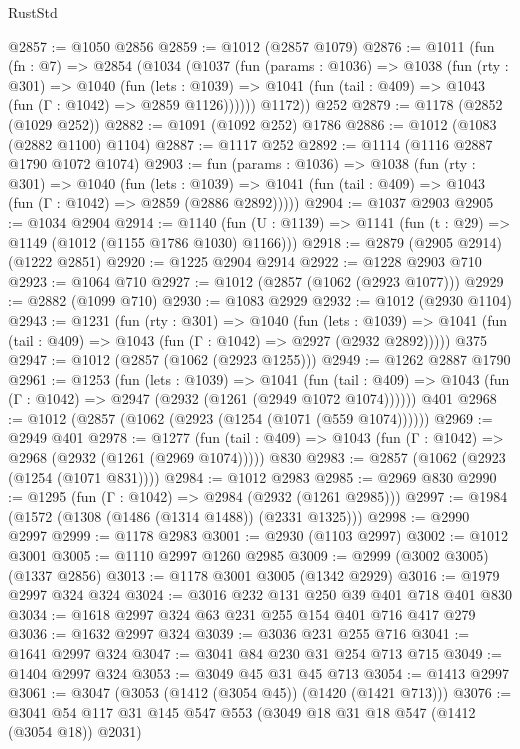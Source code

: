 \begin{lexlean}{RustStd}
\begin{coremodule}
@2857 := @1050 @2856
@2859 := @1012 (@2857 @1079)
@2876 := @1011
    (fun (fn : @7) =>
    @2854
      (@1034
        (@1037
          (fun (params : @1036) =>
          @1038
            (fun (rty : @301) =>
            @1040
              (fun (lets : @1039) =>
              @1041 (fun (tail : @409) => @1043 (fun (Γ : @1042) => @2859 @1126))))))
        @1172))
    @252
@2879 := @1178 (@2852 (@1029 @252))
@2882 := @1091 (@1092 @252) @1786
@2886 := @1012 (@1083 (@2882 @1100) @1104)
@2887 := @1117 @252
@2892 := @1114 (@1116 @2887 @1790 @1072 @1074)
@2903 := fun (params : @1036) =>
  @1038
    (fun (rty : @301) =>
    @1040
      (fun (lets : @1039) =>
      @1041 (fun (tail : @409) => @1043 (fun (Γ : @1042) => @2859 (@2886 @2892)))))
@2904 := @1037 @2903
@2905 := @1034 @2904
@2914 := @1140 (fun (U : @1139) => @1141 (fun (t : @29) => @1149 (@1012 (@1155 @1786 @1030) @1166)))
@2918 := @2879 (@2905 @2914) (@1222 @2851)
@2920 := @1225 @2904 @2914
@2922 := @1228 @2903 @710
@2923 := @1064 @710
@2927 := @1012 (@2857 (@1062 (@2923 @1077)))
@2929 := @2882 (@1099 @710)
@2930 := @1083 @2929
@2932 := @1012 (@2930 @1104)
@2943 := @1231
    (fun (rty : @301) =>
    @1040
      (fun (lets : @1039) =>
      @1041 (fun (tail : @409) => @1043 (fun (Γ : @1042) => @2927 (@2932 @2892)))))
    @375
@2947 := @1012 (@2857 (@1062 (@2923 @1255)))
@2949 := @1262 @2887 @1790
@2961 := @1253
    (fun (lets : @1039) =>
    @1041
      (fun (tail : @409) => @1043 (fun (Γ : @1042) => @2947 (@2932 (@1261 (@2949 @1072 @1074))))))
    @401
@2968 := @1012 (@2857 (@1062 (@2923 (@1254 (@1071 (@559 @1074))))))
@2969 := @2949 @401
@2978 := @1277
    (fun (tail : @409) => @1043 (fun (Γ : @1042) => @2968 (@2932 (@1261 (@2969 @1074)))))
    @830
@2983 := @2857 (@1062 (@2923 (@1254 (@1071 @831))))
@2984 := @1012 @2983
@2985 := @2969 @830
@2990 := @1295 (fun (Γ : @1042) => @2984 (@2932 (@1261 @2985)))
@2997 := @1984 (@1572 (@1308 (@1486 (@1314 @1488)) (@2331 @1325)))
@2998 := @2990 @2997
@2999 := @1178 @2983
@3001 := @2930 (@1103 @2997)
@3002 := @1012 @3001
@3005 := @1110 @2997 @1260 @2985
@3009 := @2999 (@3002 @3005) (@1337 @2856)
@3013 := @1178 @3001 @3005 (@1342 @2929)
@3016 := @1979 @2997 @324 @324
@3024 := @3016 @232 @131 @250 @39 @401 @718 @401 @830
@3034 := @1618 @2997 @324 @63 @231 @255 @154 @401 @716 @417 @279
@3036 := @1632 @2997 @324
@3039 := @3036 @231 @255 @716
@3041 := @1641 @2997 @324
@3047 := @3041 @84 @230 @31 @254 @713 @715
@3049 := @1404 @2997 @324
@3053 := @3049 @45 @31 @45 @713
@3054 := @1413 @2997
@3061 := @3047 (@3053 (@1412 (@3054 @45)) (@1420 (@1421 @713)))
@3076 := @3041 @54 @117 @31 @145 @547 @553 (@3049 @18 @31 @18 @547 (@1412 (@3054 @18)) @2031)

\end{coremodule}
\end{lexlean}
